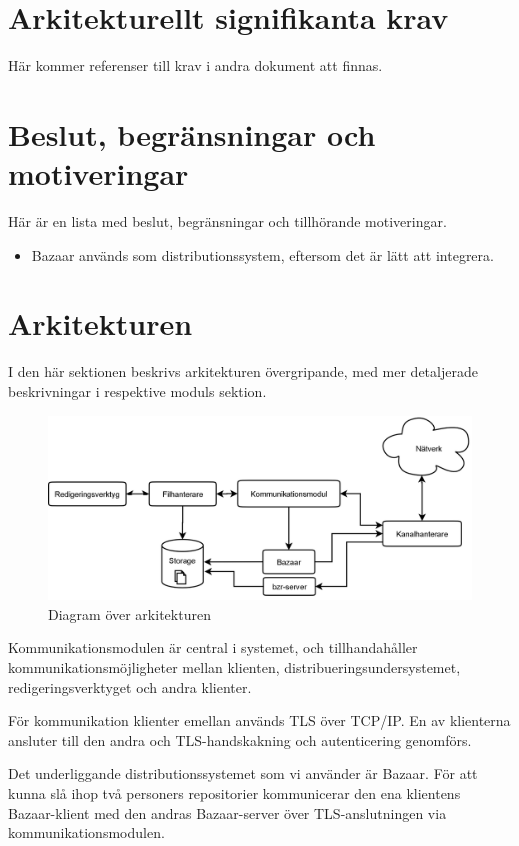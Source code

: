 \section{Arkitekturellt signifikanta krav}
Här kommer referenser till krav i andra dokument att finnas.
\section{Beslut, begränsningar och motiveringar}
Här är en lista med beslut, begränsningar och tillhörande motiveringar.
\begin{itemize}
\item Bazaar används som distributionssystem, eftersom det är lätt att integrera.
\end{itemize}
\section{Arkitekturen}
I den här sektionen beskrivs arkitekturen övergripande, med mer
detaljerade beskrivningar i respektive moduls sektion.

\begin{figure}[ht]
  \includegraphics[width=160mm]{Architecture-diagram.png}
  \caption{Diagram över arkitekturen}
  \label{fig1}
\end{figure}

Kommunikationsmodulen är central i systemet, och tillhandahåller
kommunikationsmöjligheter mellan klienten,
distribueringsundersystemet, redigeringsverktyget och andra klienter.

För kommunikation klienter emellan används TLS över TCP/IP. En av
klienterna ansluter till den andra och TLS-handskakning och
autenticering genomförs.

Det underliggande distributionssystemet som vi använder är Bazaar. För
att kunna slå ihop två personers repositorier kommunicerar den ena
klientens Bazaar-klient med den andras Bazaar-server över
TLS-anslutningen via kommunikationsmodulen.

